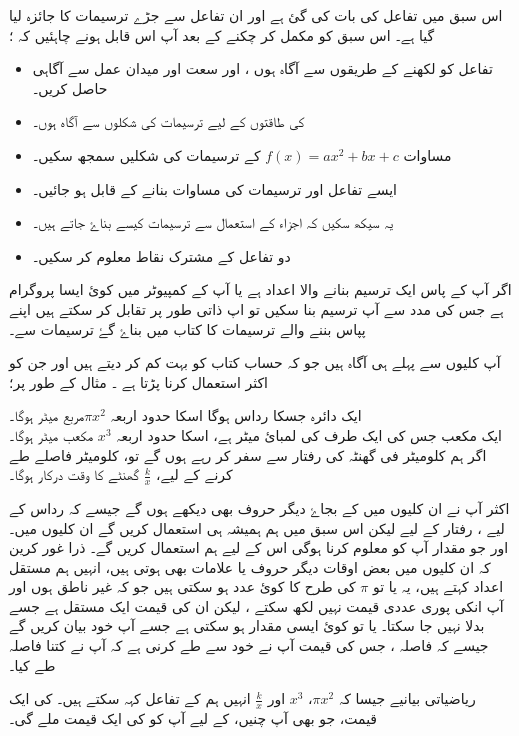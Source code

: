 اس سبق میں تفاعل کی بات کی گئ ہے اور ان تفاعل سے جڑے ترسیمات کا جائزہ لیا گیا ہے۔ اس سبق کو مکمل کر چکنے کے بعد آپ اس قابل ہونے چاہئیں کہ ؛
\begin{itemize} 
\item 
تفاعل کو لکھنے کے طریقوں سے آگاہ ہوں ، اور سعت اور میدان عمل سے آگاہی حاصل کریں۔
\item 
{} کی طاقتوں کے لیے ترسیمات کی شکلوں سے آگاہ ہوں۔
\item  
مساوات \(f(x)=ax^{2}+bx+c\) کے ترسیمات کی شکلیں سمجھ سکیں۔
\item  
ایسے تفاعل اور ترسیمات کی مساوات بنانے کے قابل ہو جائیں۔
\item  
یہ سیکھ سکیں کہ اجزاء کے استعمال سے ترسیمات کیسے بناۓ جاتے ہیں۔
\item  
دو تفاعل کے مشترک نقاط معلوم کر سکیں۔
\end{itemize}

اگر آپ کے پاس ایک ترسیم بنانے والا اعداد ہے یا آپ کے کمپیوٹر میں کوئ ایسا پروگرام ہے جس کی مدد سے آپ ترسیم بنا سکیں تو اپ ذاتی طور پر تقابل کر سکتے ہیں اپنے پپاس بننے والے ترسیمات کا کتاب میں بناۓ گۓ ترسیمات سے۔

آپ کلیوں سے پہلے ہی آگاہ ہیں جو کہ حساب کتاب کو بہت کم کر دیتے ہیں اور جن کو اکثر استعمال کرنا پڑتا ہے ۔ مثال کے طور پر؛

ایک دائرہ جسکا رداس  ہوگا اسکا حدود اربعہ \(\pi x^{2}\)مربع میٹر ہوگا۔\\ ایک مکعب جس کی ایک طرف کی لمبائ  میٹر ہے، اسکا حدود اربعہ \( x^{3} \) مکعب میٹر ہوگا۔\\ اگر ہم کلومیٹر فی گھنٹہ کی رفتار سے سفر کر رہے ہوں گے تو،   کلومیٹر فاصلے طے کرنے کے لیے، \(\frac{k}{x}\) گھنٹے کا وقت درکار ہوگا۔

اکثر آپ نے ان کلیوں میں  کے بجاۓ دیگر حروف بھی دیکھے ہوں گے جیسے کہ رداس کے لیے ، رفتار کے لیے لیکن اس سبق میں ہم ہمیشہ  ہی استعمال کریں گے ان کلیوں میں۔ اور جو مقدار آپ کو معلوم کرنا ہوگی اس کے لیے  ہم  استعمال کریں گے۔ ذرا غور کرین کہ ان کلیوں میں بعض اوقات  دیگر حروف یا علامات بھی ہوتی ہیں، انہیں ہم مستقل اعداد کہتے ہیں، یہ یا تو \( \pi \) کی طرح کا کوئ عدد ہو سکتی ہیں جو کہ غیر ناطق ہوں اور آپ انکی پوری عددی قیمت نہیں لکھ سکتے ، لیکن ان کی قیمت ایک مستقل ہے جسے بدلا نہیں جا سکتا۔ یا تو کوئ ایسی مقدار ہو سکتی ہے جسے آپ خود بیان کریں گے جیسے کہ فاصلہ ، جس کی قیمت آپ نے خود سے طے کرنی ہے کہ آپ نے کتنا فاصلہ طے کیا۔

ریاضیاتی بیانیے جیسا کہ \( \pi x^{2}\)، \( x^{3} \) اور \( \frac{k}{x} \) انہیں ہم  کے تفاعل کہہ سکتے ہیں۔  کی ایک قیمت، جو بھی آپ چنیں، کے لیے آپ کو  کی ایک قیمت ملے گی۔

